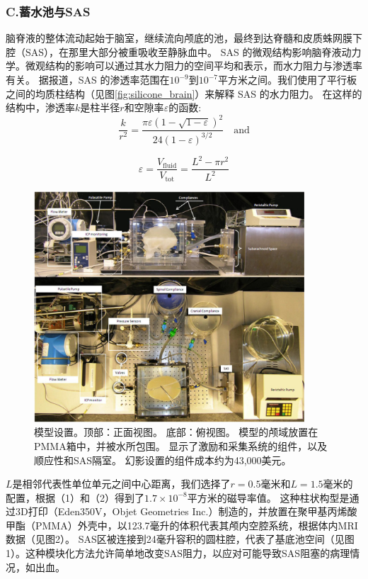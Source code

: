 \documentclass[12pt]{article}
\begin{document}
\subsubsection*{C.蓄水池与SAS}
脑脊液的整体流动起始于脑室，继续流向颅底的池，最终到达脊髓和皮质蛛网膜下腔（SAS），在那里大部分被重吸收至静脉血中。
SAS 的微观结构影响脑脊液动力学。微观结构的影响可以通过其水力阻力的空间平均和表示，而水力阻力与渗透率有关。
据报道，SAS 的渗透率范围在$10^{-9}$到$10^{-7}$平方米之间。我们使用了平行板之间的均质柱结构（见图\ref{fig:silicone_brain}）来解释 SAS 的水力阻力。
在这样的结构中，渗透率$k$是柱半径$r$和空隙率$\varepsilon$的函数:
\begin{equation}
    \frac{k}{r^2} = \frac{\pi \varepsilon \left(1 - \sqrt{1 - \varepsilon}\right)^2}{24 \left(1 - \varepsilon\right)^{3/2}} \quad \text{and}
\end{equation}

\begin{equation}
    \varepsilon = \frac{V_{\text{fluid}}}{V_{\text{tot}}} = \frac{L^2 - \pi r^2}{L^2}
\end{equation}

\begin{figure}[h]
    \centering
    \includegraphics[width=0.9\textwidth]{Figures/4.png}
    \caption{模型设置。顶部：正面视图。 底部：俯视图。 模型的颅域放置在PMMA箱中，并被水所包围。 显示了激励和采集系统的组件，以及顺应性和SAS隔室。 幻影设置的组件成本约为43,000美元。}
    \label{fig:csf_flow_path}
\end{figure}
$L$是相邻代表性单位单元之间中心距离，我们选择了$r = 0.5$毫米和$L = 1.5$毫米的配置，根据（1）和（2）得到了$1.7×10^{−8}$平方米的磁导率值。
这种柱状构型是通过3D打印（Eden350V，Objet Geometries Inc.）制造的，并放置在聚甲基丙烯酸甲酯（PMMA）外壳中，以123.7毫升的体积代表其颅内空腔系统，根据体内MRI数据（见图2）。
SAS区被连接到24毫升容积的圆柱腔，代表了基底池空间（见图1）。这种模块化方法允许简单地改变SAS阻力，以应对可能导致SAS阻塞的病理情况，如出血。
\end{document}
